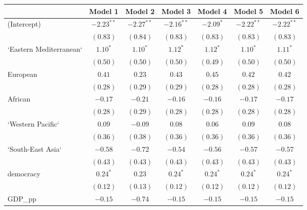 
\begin{table}[!h]
\begin{center}
\begin{tabular}{l c c c c c c }
\toprule
 & Model 1 & Model 2 & Model 3 & Model 4 & Model 5 & Model 6 \\
\midrule
(Intercept)             & $-2.23^{**}$ & $-2.27^{**}$ & $-2.16^{**}$ & $-2.09^{*}$  & $-2.22^{**}$ & $-2.22^{**}$ \\
                        & $(0.83)$     & $(0.84)$     & $(0.83)$     & $(0.83)$     & $(0.83)$     & $(0.83)$     \\
`Eastern Mediterranean` & $1.10^{*}$   & $1.10^{*}$   & $1.12^{*}$   & $1.12^{*}$   & $1.10^{*}$   & $1.11^{*}$   \\
                        & $(0.50)$     & $(0.50)$     & $(0.50)$     & $(0.49)$     & $(0.50)$     & $(0.50)$     \\
European                & $0.41$       & $0.23$       & $0.43$       & $0.45$       & $0.42$       & $0.42$       \\
                        & $(0.28)$     & $(0.29)$     & $(0.29)$     & $(0.28)$     & $(0.28)$     & $(0.28)$     \\
African                 & $-0.17$      & $-0.21$      & $-0.16$      & $-0.16$      & $-0.17$      & $-0.17$      \\
                        & $(0.28)$     & $(0.29)$     & $(0.28)$     & $(0.28)$     & $(0.28)$     & $(0.28)$     \\
`Western Pacific`       & $0.09$       & $-0.09$      & $0.08$       & $0.06$       & $0.09$       & $0.08$       \\
                        & $(0.36)$     & $(0.38)$     & $(0.36)$     & $(0.36)$     & $(0.36)$     & $(0.36)$     \\
`South-East Asia`       & $-0.58$      & $-0.72$      & $-0.54$      & $-0.56$      & $-0.57$      & $-0.57$      \\
                        & $(0.43)$     & $(0.43)$     & $(0.43)$     & $(0.43)$     & $(0.43)$     & $(0.43)$     \\
democracy               & $0.24^{*}$   & $0.23$       & $0.24^{*}$   & $0.24^{*}$   & $0.24^{*}$   & $0.24^{*}$   \\
                        & $(0.12)$     & $(0.13)$     & $(0.12)$     & $(0.12)$     & $(0.12)$     & $(0.12)$     \\
GDP\_pp                 & $-0.15$      & $-0.74$      & $-0.15$      & $-0.15$      & $-0.15$      & $-0.15$      \\

\end{tabular}
\end{center}
\end{table}
